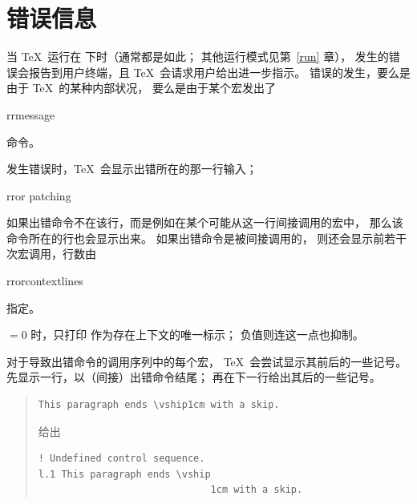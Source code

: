 \documentclass[a4paper]{rapport3}
\makeatletter
\newenvironment{example}{\begin{quotation}}{\end{quotation}}
\def\term#1\par{\index{#1}}
\def\cstoidx#1\par{\index{#1@\cs{#1}}}
\def\csidx#1{\cstoidx #1\par\cs{#1}}
\makeatother
\begin{document}
\section{错误信息}

当 \TeX\ 运行在  下时（通常都是如此；
其他运行模式见第~\ref{run} 章），
发生的错误会报告到用户终端，且 \TeX\ 会请求用户给出进一步指示。
错误的发生，要么是由于 \TeX\ 的某种内部状况，
要么是由于某个宏发出了 \csidx{errmessage} 命令。

发生错误时，\TeX\ 会显示出错所在的那一行输入；
\term error patching\par
如果出错命令不在该行，而是例如在某个可能从这一行间接调用的宏中，
那么该命令所在的行也会显示出来。
如果出错命令是被间接调用的，
则还会显示前若干次宏调用，行数由 \csidx{errorcontextlines} 指定。

${}=0$ 时，只打印  作为存在上下文的唯一标示；
负值则连这一点也抑制。

对于导致出错命令的调用序列中的每个宏，
\TeX\ 会尝试显示其前后的一些记号。
先显示一行，以（间接）出错命令结尾；
再在下一行给出其后的一些记号。

\begin{example}
\begin{verbatim}
This paragraph ends \vship1cm with a skip.
\end{verbatim}
给出
\begin{verbatim}
! Undefined control sequence.
l.1 This paragraph ends \vship
                              1cm with a skip.
\end{verbatim}
\end{example}
\end{document}

